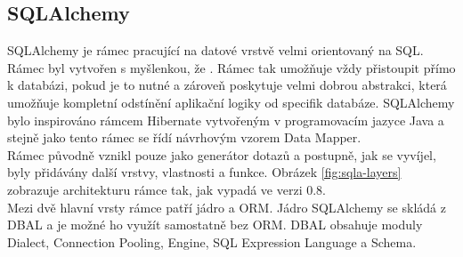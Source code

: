 \documentclass[ing,male,java,dept456]{diploma}						%
\begin{document}
\clearpage

\subsection{SQLAlchemy}

SQLAlchemy je rámec pracující na datové vrstvě velmi orientovaný na SQL. Rámec byl vytvořen s myšlenkou, že \cite{wiki-sqla}. Rámec tak umožňuje vždy přistoupit přímo k databázi, pokud je to nutné a zároveň poskytuje velmi dobrou abstrakci, která umožňuje kompletní odstínění aplikační logiky od specifik databáze. SQLAlchemy bylo inspirováno rámcem Hibernate vytvořeným v programovacím jazyce Java a stejně jako tento rámec se řídí návrhovým vzorem Data Mapper. \\ 
Rámec původně vznikl pouze jako generátor dotazů a postupně, jak se vyvíjel, byly přidávány další vrstvy, vlastnosti a funkce. Obrázek \ref{fig:sqla-layers} zobrazuje architekturu rámce tak, jak vypadá ve verzi 0.8. \\ Mezi dvě hlavní vrsty rámce patří jádro a ORM. Jádro SQLAlchemy se skládá z DBAL a je možné ho využít samostatně bez ORM. DBAL obsahuje moduly Dialect, Connection Pooling, Engine, SQL Expression Language a Schema.
\end{document}
